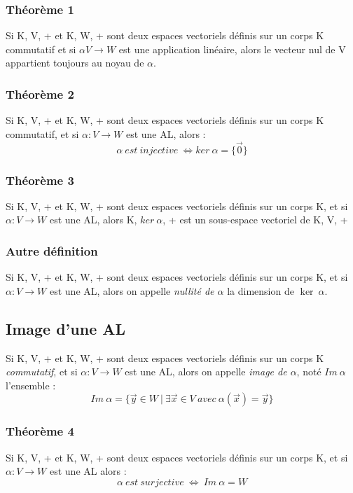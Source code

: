 \documentclass[12pt, a4paper]{article}
\begin{document}
\subsubsection{Théorème 1}
Si K, V, + et K, W, + sont deux espaces vectoriels définis sur un corps K commutatif et si $\alpha V \rightarrow W$ est une application linéaire, alors le vecteur nul de V appartient toujours au noyau de $\alpha$.

\subsubsection{Théorème 2}
Si K, V, + et K, W, + sont deux espaces vectoriels définis sur un corps K commutatif, et si $\alpha : V \rightarrow W$ est une AL, alors :
$$\alpha\ est\ injective\ \Leftrightarrow ker\ \alpha = \{\vec{0}\}$$

\subsubsection{Théorème 3}
Si K, V, + et K, W, + sont deux espaces vectoriels définis sur un corps K,  et si $\alpha : V \rightarrow W$ est une AL, alors K, $ker\ \alpha$, + est un sous-espace vectoriel de K, V, +

\subsubsection{Autre définition}
Si K, V, + et K, W, + sont deux espaces vectoriels définis sur un corps K,  et si $\alpha : V \rightarrow W$ est une AL, alors on appelle \textit{nullité de $\alpha$} la dimension de $\ker\ \alpha$.

\subsection{Image d'une AL}
Si K, V, + et K, W, + sont deux espaces vectoriels définis sur un corps K \textit{commutatif},  et si $\alpha : V \rightarrow W$ est une AL, alors on appelle \textit{image de $\alpha$}, noté $Im\ \alpha$ l'ensemble :
$$Im\ \alpha = \{\vec{y} \in W\ |\ \exists \vec{x} \in V\ avec\ \alpha(\vec{x}) = \vec{y}\}$$

\subsubsection{Théorème 4}
Si K, V, + et K, W, + sont deux espaces vectoriels définis sur un corps K,  et si $\alpha : V \rightarrow W$ est une AL alors :
$$\alpha\ est\ surjective\ \Leftrightarrow\ Im\ \alpha = W$$
\end{document}
